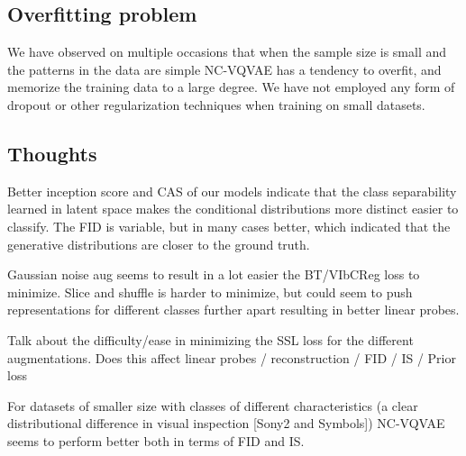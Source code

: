 \documentclass[../../thesis.tex]{subfiles}
\begin{document}



\subsection{Overfitting problem}

We have observed on multiple occasions that when the sample size is small and the patterns in the data are simple NC-VQVAE has a tendency to overfit, and memorize the training data to a large degree. We have not employed any form of dropout or other regularization techniques when training on small datasets. 

\subsection{Thoughts}

Better inception score and CAS of our models indicate that the class separability learned in latent space makes the conditional distributions more distinct easier to classify. The FID is variable, but in many cases better, which indicated that the generative distributions are closer to the ground truth.\newline

Gaussian noise aug seems to result in a lot easier the BT/VIbCReg loss to minimize. \newline
Slice and shuffle is harder to minimize, but could seem to push representations for different classes further apart resulting in better linear probes.\newline

Talk about the difficulty/ease in minimizing the SSL loss for the different augmentations. Does this affect linear probes / reconstruction / FID / IS / Prior loss
\newline



For datasets of smaller size with classes of different characteristics (a clear distributional difference in visual inspection [Sony2 and Symbols]) NC-VQVAE seems to perform better both in terms of FID and IS. \newline
\end{document}
